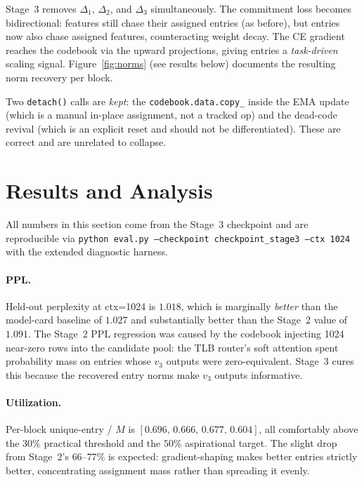 \documentclass[11pt,a4paper]{article}
\begin{document}
Stage~3 removes $\Delta_1$, $\Delta_2$, and $\Delta_3$ simultaneously. The commitment loss
becomes bidirectional: features still chase their assigned entries (as before), but entries
now also chase assigned features, counteracting weight decay. The CE gradient reaches the
codebook via the upward projections, giving entries a \textit{task-driven} scaling
signal. Figure~\ref{fig:norms} (see results below) documents the resulting norm recovery
per block.

Two \texttt{detach()} calls are \textit{kept}: the \texttt{codebook.data.copy\_} inside the
EMA update (which is a manual in-place assignment, not a tracked op) and the dead-code
revival (which is an explicit reset and should not be differentiated). These are correct
and are unrelated to collapse.

\section{Results and Analysis}

All numbers in this section come from the Stage~3 checkpoint and are reproducible via
\texttt{python eval.py --checkpoint checkpoint\_stage3 --ctx 1024} with the extended
diagnostic harness.

\paragraph{PPL.} Held-out perplexity at ctx=1024 is $1.018$, which is marginally
\textit{better} than the model-card baseline of $1.027$ and substantially better than the
Stage~2 value of $1.091$. The Stage~2 PPL regression was caused by the codebook injecting
1024 near-zero rows into the candidate pool: the TLB router's soft attention spent
probability mass on entries whose $v_3$ outputs were zero-equivalent. Stage~3 cures this
because the recovered entry norms make $v_3$ outputs informative.

\paragraph{Utilization.} Per-block unique-entry / $M$ is $[0.696,\, 0.666,\, 0.677,\, 0.604]$,
all comfortably above the $30\%$ practical threshold and the $50\%$ aspirational target.
The slight drop from Stage~2's $66$--$77\%$ is expected: gradient-shaping makes better
entries strictly better, concentrating assignment mass rather than spreading it evenly.
\end{document}
